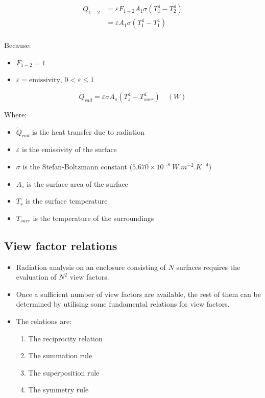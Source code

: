 \documentclass[11pt]{article}
\begin{document}
\begin{align*}
Q_{1-2} &= \varepsilon F_{1-2} A_1 \sigma (T_1^4 - T_2^4) \\
&= \varepsilon A_1 \sigma (T_1^4 - T_1^4) \\
\end{align*}

Because:
\begin{itemize}
\item \(F_{1-2} = 1\)
\item \(\varepsilon = \text{emissivity}\), \(0 < \varepsilon \le 1\)
\end{itemize}

\[\dot{Q}_{rad} = \varepsilon \sigma A_s (T_s^4 - T_{surr}^4) \quad (\unit{W})\]

Where:
\begin{itemize}
\item \(\dot{Q}_{rad}\) is the heat transfer due to radiation
\item \(\varepsilon\) is the emissivity of the surface
\item \(\sigma\) is the Stefan-Boltzmann constant (\(5.670 \times 10^{-8} \ \unit{W.m^{-2}.K^{-4}}\))
\item \(A_s\) is the surface area of the surface
\item \(T_s\) is the surface temperature
\item \(T_{surr}\) is the temperature of the surroundings
\end{itemize}
\subsection{View factor relations}
\label{sec:orgc33e687}
\begin{itemize}
\item Radiation analysis on an enclosure consisting of \(N\) surfaces requires the evaluation of \(N^2\) view factors.
\item Once a sufficient number of view factors are available, the rest of them can be determined by utilising some fundamental relations for view factors.
\item The relations are:
\begin{enumerate}
\item The reciprocity relation
\item The summation rule
\item The superposition rule
\item The symmetry rule
\end{enumerate}
\end{itemize}
\end{document}
